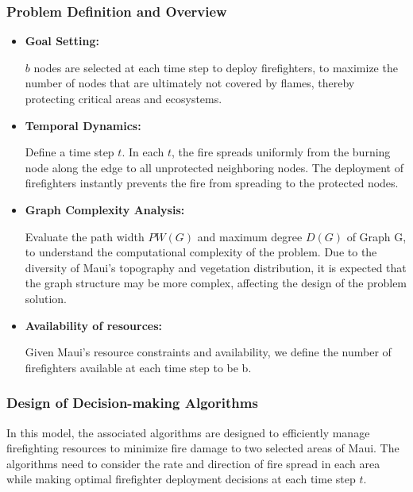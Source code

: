 \documentclass[12pt]{article}  %
\begin{document}
\subsubsection*{Problem Definition and Overview}
\begin{itemize}
	\setlength{\parsep}{0ex} 
	\setlength{\topsep}{2ex} 
	\setlength{\itemsep}{1ex} 
	\item \textbf{Goal Setting:} 
	
	 $b$ nodes are selected at each time step to deploy firefighters, to maximize the number of nodes that are ultimately not covered by flames, thereby protecting critical areas and ecosystems.
	
	\item \textbf{Temporal Dynamics:} 
	
	 Define a time step $t$. In each $t$, the fire spreads uniformly from the burning node along the edge to all unprotected neighboring nodes. The deployment of firefighters instantly prevents the fire from spreading to the protected nodes.
	
	\item \textbf{Graph Complexity Analysis:} 
	
	 Evaluate the path width $PW(G)$ and maximum degree $D(G)$ of Graph G, to understand the computational complexity of the problem. Due to the diversity of Maui's topography and vegetation distribution, it is expected that the graph structure may be more complex, affecting the design of the problem solution.
	
	\item \textbf{Availability of resources:} 
	
	Given Maui's resource constraints and availability, we define the number of firefighters available at each time step to be b.
\end{itemize}

\subsubsection{Design of Decision-making Algorithms}
In this model, the associated algorithms are designed to efficiently manage firefighting resources to minimize fire damage to two selected areas of Maui. The algorithms need to consider the rate and direction of fire spread in each area while making optimal firefighter deployment decisions at each time step $t$.
\end{document}

